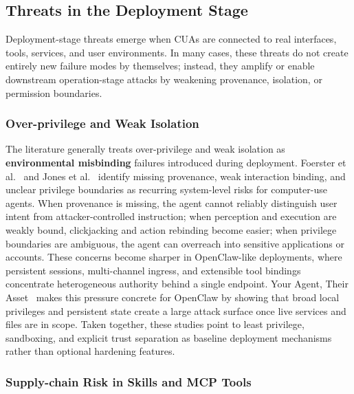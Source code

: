 \subsection{Threats in the Deployment Stage}
\label{subsec:threats_deployment}

Deployment-stage threats emerge when CUAs are connected to real interfaces, tools, services, and user environments. In many cases, these threats do not create entirely new failure modes by themselves; instead, they amplify or enable downstream operation-stage attacks by weakening provenance, isolation, or permission boundaries.

\subsubsection{Over-privilege and Weak Isolation}

The literature generally treats over-privilege and weak isolation as \textbf{environmental misbinding} failures introduced during deployment. Foerster et al.~\cite{foerster2026camels} and Jones et al.~\cite{jones2025systematization} identify missing provenance, weak interaction binding, and unclear privilege boundaries as recurring system-level risks for computer-use agents. When provenance is missing, the agent cannot reliably distinguish user intent from attacker-controlled instruction; when perception and execution are weakly bound, clickjacking and action rebinding become easier; when privilege boundaries are ambiguous, the agent can overreach into sensitive applications or accounts. These concerns become sharper in OpenClaw-like deployments, where persistent sessions, multi-channel ingress, and extensible tool bindings concentrate heterogeneous authority behind a single endpoint. Your Agent, Their Asset~\cite{wang2026asset} makes this pressure concrete for OpenClaw by showing that broad local privileges and persistent state create a large attack surface once live services and files are in scope. Taken together, these studies point to least privilege, sandboxing, and explicit trust separation as baseline deployment mechanisms rather than optional hardening features.

\subsubsection{Supply-chain Risk in Skills and MCP Tools}


